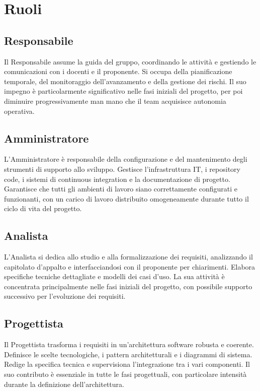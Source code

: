 \documentclass[a4paper,11pt]{article}
\begin{document}
\section{Ruoli}

\subsection{Responsabile}
Il Responsabile assume la guida del gruppo, coordinando le attività e gestiendo le comunicazioni con i docenti e il proponente. Si occupa della pianificazione temporale, del monitoraggio dell'avanzamento e della gestione dei rischi. Il suo impegno è particolarmente significativo nelle fasi iniziali del progetto, per poi diminuire progressivamente man mano che il team acquisisce autonomia operativa.

\subsection{Amministratore}
L'Amministratore è responsabile della configurazione e del mantenimento degli strumenti di supporto allo sviluppo. Gestisce l'infrastruttura IT, i repository code, i sistemi di continuous integration e la documentazione di progetto. Garantisce che tutti gli ambienti di lavoro siano correttamente configurati e funzionanti, con un carico di lavoro distribuito omogeneamente durante tutto il ciclo di vita del progetto.

\subsection{Analista}
L'Analista si dedica allo studio e alla formalizzazione dei requisiti, analizzando il capitolato d'appalto e interfacciandosi con il proponente per chiarimenti. Elabora specifiche tecniche dettagliate e modelli dei casi d'uso. La sua attività è concentrata principalmente nelle fasi iniziali del progetto, con possibile supporto successivo per l'evoluzione dei requisiti.

\subsection{Progettista}
Il Progettista trasforma i requisiti in un'architettura software robusta e coerente. Definisce le scelte tecnologiche, i pattern architetturali e i diagrammi di sistema. Redige la specifica tecnica e supervisiona l'integrazione tra i vari componenti. Il suo contributo è essenziale in tutte le fasi progettuali, con particolare intensità durante la definizione dell'architettura.
\end{document}
